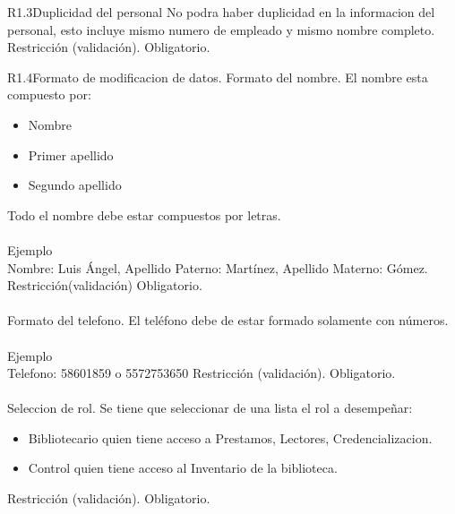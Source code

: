 
\begin{BussinesRule}{R1.3}{Duplicidad del personal} 
	\BRitem[Descripción:] No podra haber duplicidad en la informacion del personal, esto incluye mismo numero de empleado y mismo nombre completo. 
	\BRitem[Tipo:] Restricción (validación).
	\BRitem[Nivel:] Obligatorio.
\end{BussinesRule}


\begin{BussinesRule}{R1.4}{Formato de modificacion de datos.} 
	\BRitem[Nombre:] Formato del nombre.
	\BRitem[Descripción:] El nombre esta compuesto por:
		\begin{itemize} 
			\item Nombre
			\item Primer apellido
			\item Segundo apellido 
		\end{itemize}
		Todo el nombre debe estar compuestos por letras.\\\\
	Ejemplo \\
	Nombre: Luis Ángel, Apellido Paterno: Martínez, Apellido Materno: Gómez.
	\BRitem[Tipo:] Restricción(validación)
	\BRitem[Nivel:] Obligatorio.\\\\

	\BRitem[Telefono:] Formato del telefono.
	\BRitem[Descripción:] El teléfono debe de estar formado solamente con números.\\\\
	Ejemplo \\
	Telefono: 58601859 o 5572753650
	\BRitem[Tipo:] Restricción (validación).
	\BRitem[Nivel:] Obligatorio.\\\\

	 Seleccion de rol.
	\BRitem[Descripción:] Se tiene que seleccionar de una lista el rol a desempeñar:
		\begin{itemize} 
			\item Bibliotecario quien tiene acceso a Prestamos, Lectores, Credencializacion.
			\item Control quien tiene acceso al Inventario de la biblioteca.
		\end{itemize}
	\BRitem[Tipo:] Restricción (validación).
	\BRitem[Nivel:] Obligatorio.\\\\


\end{BussinesRule}
